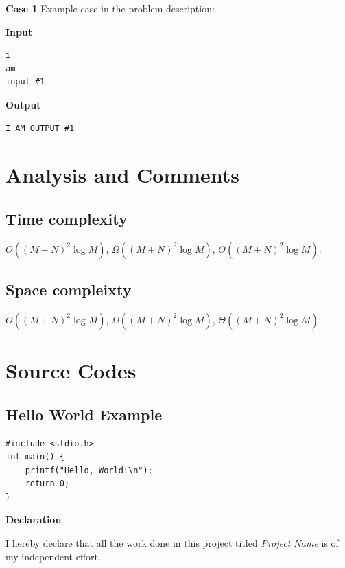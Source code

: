 \documentclass[10pt, twoside]{article}
\newcommand{\projectname}{
    Project Name
}
\begin{document}
\textbf{Case 1} Example case in the problem description:

\hspace{1cm}
\begin{minipage}[t]{0.3\textwidth}
    \textbf{Input}
    \begin{verbatim}
i
am
input #1
\end{verbatim}
\end{minipage}
\begin{minipage}[t]{0.2\textwidth}
    \textbf{Output}
    \begin{verbatim}
I AM OUTPUT #1
\end{verbatim}
\end{minipage}

\section{Analysis and Comments}

\subsection{Time complexity}

$O((M+N)^2 \log M)$, $\Omega((M+N)^2 \log M)$, $\Theta((M+N)^2 \log M)$.

\lipsum[4-6]


\subsection{Space compleixty}

\lipsum[2-5]

$O((M+N)^2 \log M)$, $\Omega((M+N)^2 \log M)$, $\Theta((M+N)^2 \log M)$.

\newpage

\section{Source Codes}

\subsection{Hello World Example}
\begin{verbatim}
#include <stdio.h>
int main() {
    printf("Hello, World!\n");
    return 0;
}
\end{verbatim}

\textbf{Declaration}

I hereby declare that all the work done in this project titled
\textit{\projectname} is of my independent effort.



\end{document}
